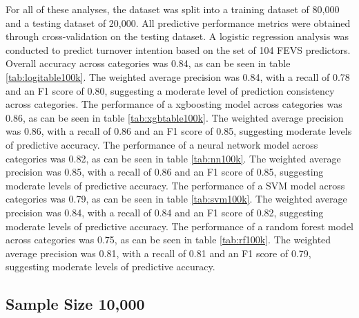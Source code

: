 \documentclass[
  man]{apa7}
\begin{document}
For all of these analyses, the dataset was split into a training dataset of 80,000 and a testing dataset of 20,000. All predictive performance metrics were obtained through cross-validation on the testing dataset. A logistic regression analysis was conducted to predict turnover intention based on the set of 104 FEVS predictors. Overall accuracy across categories was 0.84, as can be seen in table \ref{tab:logitable100k}. The weighted average precision was 0.84, with a recall of 0.78 and an F1 score of 0.80, suggesting a moderate level of prediction consistency across categories.
The performance of a xgboosting model across categories was 0.86, as can be seen in table \ref{tab:xgbtable100k}. The weighted average precision was 0.86, with a recall of 0.86 and an F1 score of 0.85, suggesting moderate levels of predictive accuracy.
The performance of a neural network model across categories was 0.82, as can be seen in table \ref{tab:nn100k}. The weighted average precision was 0.85, with a recall of 0.86 and an F1 score of 0.85, suggesting moderate levels of predictive accuracy.
The performance of a SVM model across categories was 0.79, as can be seen in table \ref{tab:svm100k}. The weighted average precision was 0.84, with a recall of 0.84 and an F1 score of 0.82, suggesting moderate levels of predictive accuracy.
The performance of a random forest model across categories was 0.75, as can be seen in table \ref{tab:rf100k}. The weighted average precision was 0.81, with a recall of 0.81 and an F1 score of 0.79, suggesting moderate levels of predictive accuracy.

\hypertarget{sample-size-10000}{%
\subsection{Sample Size 10,000}\label{sample-size-10000}}
\end{document}
